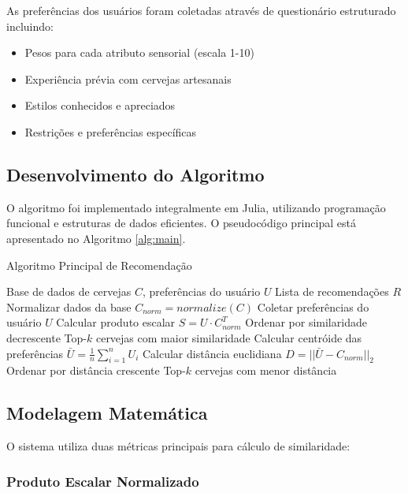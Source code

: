 \documentclass[12pt,a4paper]{article}
\begin{document}
As preferências dos usuários foram coletadas através de questionário estruturado incluindo:

\begin{itemize}
\item Pesos para cada atributo sensorial (escala 1-10)
\item Experiência prévia com cervejas artesanais
\item Estilos conhecidos e apreciados
\item Restrições e preferências específicas
\end{itemize}

\subsection{Desenvolvimento do Algoritmo}

O algoritmo foi implementado integralmente em Julia, utilizando programação funcional e estruturas de dados eficientes. O pseudocódigo principal está apresentado no Algoritmo \ref{alg:main}.

\begin{algorithm}[H]
\caption{Algoritmo Principal de Recomendação}
\label{alg:main}
\begin{algorithmic}[1]
\REQUIRE Base de dados de cervejas $C$, preferências do usuário $U$
\ENSURE Lista de recomendações $R$
\STATE Normalizar dados da base $C_{norm} = normalize(C)$
\STATE Coletar preferências do usuário $U$
    \STATE Calcular produto escalar $S = U \cdot C_{norm}^T$
    \STATE Ordenar por similaridade decrescente
    \RETURN Top-$k$ cervejas com maior similaridade
\ELSE
    \STATE Calcular centróide das preferências $\bar{U} = \frac{1}{n}\sum_{i=1}^{n} U_i$
    \STATE Calcular distância euclidiana $D = ||\bar{U} - C_{norm}||_2$
    \STATE Ordenar por distância crescente
    \RETURN Top-$k$ cervejas com menor distância
\ENDIF
\end{algorithmic}
\end{algorithm}

\subsection{Modelagem Matemática}

O sistema utiliza duas métricas principais para cálculo de similaridade:

\subsubsection{Produto Escalar Normalizado}
\end{document}
